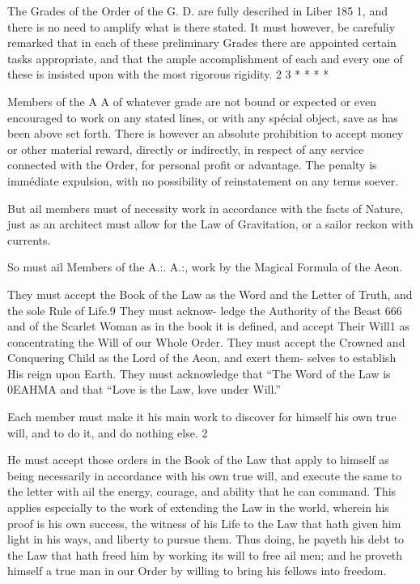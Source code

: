 The Grades of the Order of the G. D. are fully descrihed in Liber 185 1, and there is no need to amplify what is there stated. It must however, be carefuliy remarked that in each of these preliminary Grades there are appointed certain tasks appropriate, and that the ample accomplishment of each and every one of these is insisted upon with the most rigorous rigidity. 2 3 * * * *

Members of the A A of whatever grade are not bound or expected or even encouraged to work on any stated lines, or with any spécial object, save as has been above set forth. There is however an absolute prohibition to accept money or other material reward, directly or indirectly, in respect of any service connected with the Order, for personal profit or advantage. The penalty is immédiate expulsion, with no possibility of reinstatement on any terms soever.

But ail members must of necessity work in accordance with the facts of Nature, just as an architect must allow for the Law of Gravitation, or a sailor reckon with currents.

So must ail Members of the A.:. A.:, work by the Magical Formula of the Aeon.

They must accept the Book of the Law as the Word and the Letter of Truth, and the sole Rule of Life.9 They must acknow- ledge the Authority of the Beast 666 and of the Scarlet Woman as in the book it is defined, and accept Their Will1 as concentrating the Will of our Whole Order. They must accept the Crowned and Conquering Child as the Lord of the Aeon, and exert them- selves to establish His reign upon Earth. They must acknowledge that “The Word of the Law is 0EAHMA and that “Love is the Law, love under Will.”

Each member must make it his main work to discover for himself his own true will, and to do it, and do nothing else. 2

He must accept those orders in the Book of the Law that apply to himself as being necessarily in accordance with his own true will, and execute the same to the letter with ail the energy, courage, and ability that he can command. This applies especially to the work of extending the Law in the world, wherein his proof is his own success, the witness of his Life to the Law that hath given him light in his ways, and liberty to pursue them. Thus doing, he payeth his debt to the Law that hath freed him by working its will to free ail men; and he proveth himself a true man in our Order by willing to bring his fellows into freedom.

